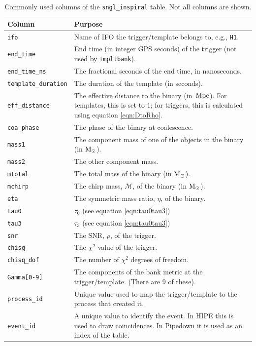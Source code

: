 \begin{table}[p]
\label{tab:sngl_inspiral}
\center
\begin{tabular}{l | p{9cm}}
Column      &   Purpose     \\
\hline \hline
\texttt{ifo}            &   Name of \ac{IFO} the trigger/template belongs to, e.g., \texttt{H1}. \\
\hline
\texttt{end\_time}      &   End time (in integer GPS seconds) of the trigger (not used by \texttt{tmpltbank}). \\
\hline
\texttt{end\_time\_ns}  & The fractional seconds of the end time, in nanoseconds. \\
\hline
\texttt{template\_duration} & The duration of the template (in seconds). \\
\hline
\texttt{eff\_distance}      & The effective distance to the binary (in $\,\mathrm{Mpc}$). For templates, this is set to 1; for triggers, this is calculated using equation \ref{eqn:DtoRho}. \\
\hline
\texttt{coa\_phase}     & The phase of the binary at coalescence. \\
\hline
\texttt{mass1}      & The component mass of one of the objects in the binary (in $\mathrm{M_\odot}$). \\
\hline
\texttt{mass2}      & The other component mass. \\
\hline
\texttt{mtotal}     & The total mass of the binary (in $\mathrm{M_\odot}$). \\
\hline
\texttt{mchirp}     & The chirp mass, $\mathcal{M}$, of the binary (in $\mathrm{M_\odot}$). \\
\hline
\texttt{eta}        & The symmetric mass ratio, $\eta$, of the binary. \\
\hline
\texttt{tau0}       & $\tau_0$ (see equation \ref{eqn:tau0tau3}) \\
\hline
\texttt{tau3}       & $\tau_3$ (see equation \ref{eqn:tau0tau3}) \\
\hline
\texttt{snr}        & The \ac{SNR}, $\rho$, of the trigger. \\
\hline
\texttt{chisq}      & The $\chi^2$ value of the trigger. \\
\hline
\texttt{chisq\_dof} & The number of $\chi^2$ degrees of freedom. \\
\hline
\texttt{Gamma[0-9]} & The components of the bank metric at the trigger/template. (There are 9 of these). \\
\hline
\texttt{process\_id}        &   Unique value used to map the trigger/template to the process that created it. \\
\hline
\texttt{event\_id}  & A unique value to identify the event. In \ac{HIPE} this is used to draw coincidences. In Pipedown it is used as an index of the table.
\end{tabular}
\caption{Commonly used columns of the \texttt{sngl\_inspiral} table. Not all columns are shown.}
\end{table}

